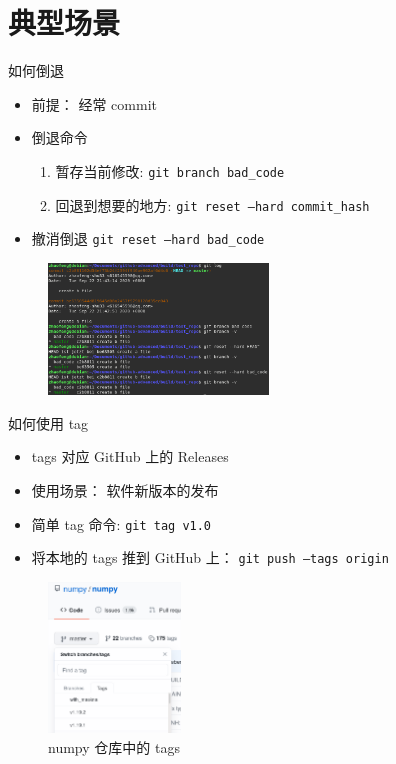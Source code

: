 \documentclass[notheorems,xetex]{beamer}
\begin{document}
\section{典型场景}
\frame{\tableofcontents[currentsection]}
\begin{frame}{如何倒退}
\begin{itemize}
	\item 前提： 经常 commit
	\item 倒退命令
	\begin{enumerate}
		\item 暂存当前修改: \texttt{git branch bad\_code}
		\item 回退到想要的地方: \texttt{git reset --hard commit\_hash}
	\end{enumerate}
	\item 撤消倒退 \texttt{git reset --hard bad\_code}
\end{itemize}
\begin{figure}
	\includegraphics[height=3.5cm]{example_reset.png}
\end{figure}
\end{frame}

\begin{frame}{如何使用 tag}
\begin{itemize}
	\item tags 对应 GitHub 上的 Releases
	\item 使用场景： 软件新版本的发布
	\item 简单 tag 命令: \texttt{git tag v1.0}
	\item 将本地的 tags 推到 GitHub 上： \texttt{git push --tags origin}
\end{itemize}
\begin{figure}
	\includegraphics[height=4cm]{numpy_tags.png}
	\caption{numpy 仓库中的 tags}
\end{figure}
\end{frame}
\end{document}
